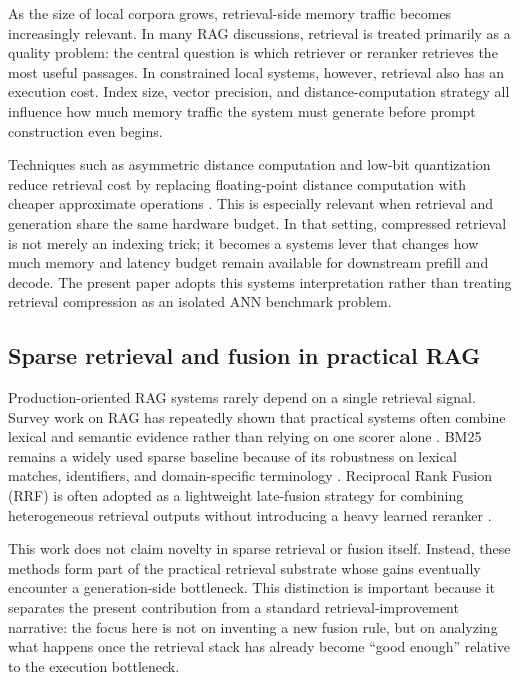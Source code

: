 \documentclass[10pt,twocolumn]{article}
\begin{document}
As the size of local corpora grows, retrieval-side memory traffic becomes increasingly relevant. In many RAG discussions, retrieval is treated primarily as a quality problem: the central question is which retriever or reranker retrieves the most useful passages. In constrained local systems, however, retrieval also has an execution cost. Index size, vector precision, and distance-computation strategy all influence how much memory traffic the system must generate before prompt construction even begins.

Techniques such as asymmetric distance computation and low-bit quantization reduce retrieval cost by replacing floating-point distance computation with cheaper approximate operations \cite{zandieh2025turboquant}. This is especially relevant when retrieval and generation share the same hardware budget. In that setting, compressed retrieval is not merely an indexing trick; it becomes a systems lever that changes how much memory and latency budget remain available for downstream prefill and decode. The present paper adopts this systems interpretation rather than treating retrieval compression as an isolated ANN benchmark problem.

\subsection{Sparse retrieval and fusion in practical RAG}

Production-oriented RAG systems rarely depend on a single retrieval signal. Survey work on RAG has repeatedly shown that practical systems often combine lexical and semantic evidence rather than relying on one scorer alone \cite{gao2023rag}. BM25 remains a widely used sparse baseline because of its robustness on lexical matches, identifiers, and domain-specific terminology \cite{robertson2009bm25}. Reciprocal Rank Fusion (RRF) is often adopted as a lightweight late-fusion strategy for combining heterogeneous retrieval outputs without introducing a heavy learned reranker \cite{cormack2009rrf}.

This work does not claim novelty in sparse retrieval or fusion itself. Instead, these methods form part of the practical retrieval substrate whose gains eventually encounter a generation-side bottleneck. This distinction is important because it separates the present contribution from a standard retrieval-improvement narrative: the focus here is not on inventing a new fusion rule, but on analyzing what happens once the retrieval stack has already become ``good enough'' relative to the execution bottleneck.
\end{document}
